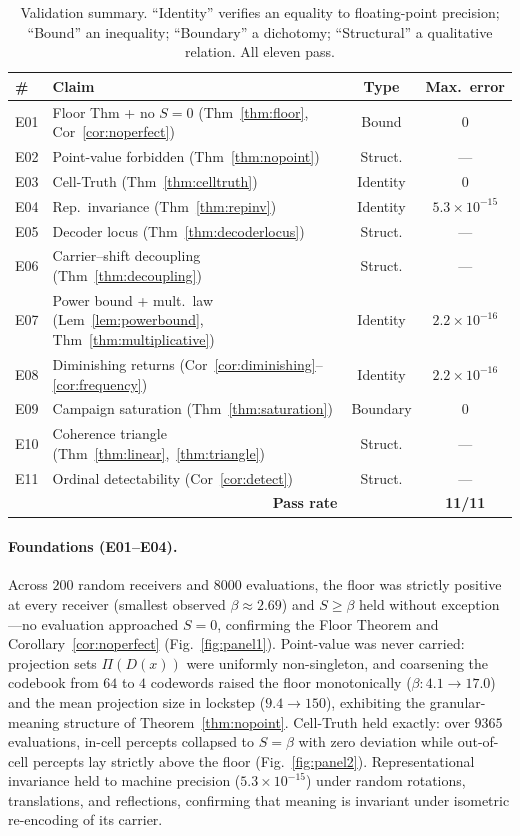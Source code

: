 \documentclass[twocolumn,11pt,a4paper]{article}
\theoremstyle{adv}
\theoremstyle{definition}
\theoremstyle{remark}
\newcommand{\Dec}{D}                   %
\newcommand{\Proj}{\Pi}                %
\newcommand{\Sval}{S}                  %
\newcommand{\floor}{\beta}            %
\begin{document}
\begin{table}[t]
\centering
\small
\caption{Validation summary. ``Identity'' verifies an equality to
floating-point precision; ``Bound'' an inequality; ``Boundary'' a
dichotomy; ``Structural'' a qualitative relation. All eleven pass.}
\label{tab:validation}
\begin{tabular}{@{}llcc@{}}
\toprule
\# & Claim & Type & Max.\ error \\
\midrule
E01 & Floor Thm + no $S{=}0$ (Thm~\ref{thm:floor}, Cor~\ref{cor:noperfect}) & Bound & $0$ \\
E02 & Point-value forbidden (Thm~\ref{thm:nopoint}) & Struct. & --- \\
E03 & Cell-Truth (Thm~\ref{thm:celltruth}) & Identity & $0$ \\
E04 & Rep.\ invariance (Thm~\ref{thm:repinv}) & Identity & $5.3{\times}10^{-15}$ \\
E05 & Decoder locus (Thm~\ref{thm:decoderlocus}) & Struct. & --- \\
E06 & Carrier--shift decoupling (Thm~\ref{thm:decoupling}) & Struct. & --- \\
E07 & Power bound + mult.\ law (Lem~\ref{lem:powerbound}, Thm~\ref{thm:multiplicative}) & Identity & $2.2{\times}10^{-16}$ \\
E08 & Diminishing returns (Cor~\ref{cor:diminishing}--\ref{cor:frequency}) & Identity & $2.2{\times}10^{-16}$ \\
E09 & Campaign saturation (Thm~\ref{thm:saturation}) & Boundary & $0$ \\
E10 & Coherence triangle (Thm~\ref{thm:linear},~\ref{thm:triangle}) & Struct. & --- \\
E11 & Ordinal detectability (Cor~\ref{cor:detect}) & Struct. & --- \\
\midrule
\multicolumn{2}{r}{\textbf{Pass rate}} & & \textbf{11/11} \\
\bottomrule
\end{tabular}
\end{table}

\paragraph{Foundations (E01--E04).}
Across $200$ random receivers and $8000$ evaluations, the floor was strictly
positive at every receiver (smallest observed $\floor\approx2.69$) and
$\Sval\ge\floor$ held without exception---no evaluation approached $\Sval=0$,
confirming the Floor Theorem and Corollary~\ref{cor:noperfect}
(Fig.~\ref{fig:panel1}). Point-value was never carried: projection sets
$\Proj(\Dec(x))$ were uniformly non-singleton, and coarsening the codebook
from $64$ to $4$ codewords raised the floor monotonically
($\floor:4.1\!\to\!17.0$) and the mean projection size in lockstep
($9.4\!\to\!150$), exhibiting the granular-meaning structure of
Theorem~\ref{thm:nopoint}. Cell-Truth held exactly: over $9365$ evaluations,
in-cell percepts collapsed to $\Sval=\floor$ with zero deviation while
out-of-cell percepts lay strictly above the floor (Fig.~\ref{fig:panel2}).
Representational invariance held to machine precision
($5.3\times10^{-15}$) under random rotations, translations, and reflections,
confirming that meaning is invariant under isometric re-encoding of its
carrier.
\end{document}
